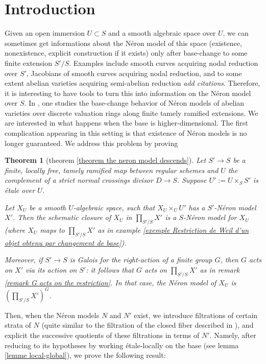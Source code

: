 \documentclass{article}
\newtheorem{thm}{Theorem}[section]
\theoremstyle{definition}
\theoremstyle{remark}
\begin{document}
\title{}
\author{Thibault Poiret}


\section{Introduction}

	Given an open immersion $U\subset S$ and a smooth algebraic space over $U$, we can sometimes get informations about the N\'eron model of this space (existence, nonexistence, explicit construction if it exists) only after base-change to some finite extension $S'/S$. Examples include smooth curves acquiring nodal reduction over $S'$, Jacobians of smooth curves acquiring nodal reduction, and to some extent abelian varieties acquiring semi-abelian reduction \cite{me&G-dog} \emph{add citations}. Therefore, it is interesting to have tools to turn this into information on the N\'eron model over $S$. 	
In \cite{TameRamification}, one studies the base-change behavior of N\'eron models of abelian varieties over discrete valuation rings along finite tamely ramified extensions. We are interested in what happens when the base is higher-dimensional. The first complication appearing in this setting is that existence of N\'eron models is no longer guaranteed. We address this problem by proving
\begin{thm}[theorem \ref{theorem the neron model descends}]
Let $S'\longrightarrow S$ be a finite, locally free, tamely ramified map between regular schemes and $U$ the complement of a strict normal crossings divisor $D\longrightarrow S$. Suppose $U':=U\times_S S'$ is \'etale over $U$.

Let $X_U$ be a smooth $U$-algebraic space, such that $X_U\times_U U'$ has a $S'$-N\'eron model $X'$. Then the schematic closure of $X_U$ in $\prod\limits_{S'/S}X'$ is a $S$-N\'eron model for $X_U$ (where $X_U$ maps to $\prod\limits_{S'/S}X'$ as in example \ref{exemple Restriction de Weil d'un objet obtenu par changement de base}).

Moreover, if $S'\longrightarrow S$ is Galois for the right-action of a finite group $G$, then $G$ acts on $X'$ via its action on $S'$: it follows that $G$ acts on $\prod\limits_{S'/S}X'$ as in remark \ref{remark G acts on the restriction}. In that case, the N\'eron model of $X_U$ is $(\prod\limits_{S'/S}X')^G$.
\end{thm}
Then, when the N\'eron models $N$ and $N'$ exist, we introduce filtrations of certain strata of $N$ (quite similar to the filtration of the closed fiber described in \cite{TameRamification}), and explicit the successive quotients of these filtrations in terms of $N'$. Namely, after reducing to its hypotheses by working \'etale-locally on the base (see lemma \ref{lemme local-global}), we prove the following result:
\end{document}
